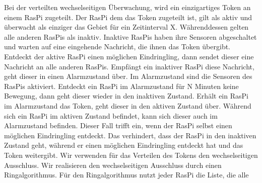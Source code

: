 \documentclass[journal]{IEEEtran}
\begin{document}
Bei der verteilten wechselseitigen Überwachung, wird ein einzigartiges Token an einem RasPi zugeteilt. Der RasPi dem das Token zugeteilt ist, gilt als aktiv und überwacht als einziger das Gebiet für ein Zeitinterval X. Währenddessen gelten alle anderen RasPis als inaktiv. Inaktive RasPis haben ihre Sensoren abgeschaltet und warten auf eine eingehende Nachricht, die ihnen das Token übergibt. Entdeckt der aktive RasPi einen möglichen Eindringling, dann sendet dieser eine Nachricht an alle anderen RasPis. Empfängt ein inaktiver RasPi diese Nachricht, geht dieser in einen Alarmzustand über. Im Alarmzustand sind die Sensoren des RasPis aktiviert. Entdeckt ein RasPi im Alarmzustand für N Minuten keine Bewegung, dann geht dieser wieder in den inaktiven Zustand. Erhält ein RasPi im Alarmzustand das Token, geht dieser in den aktiven Zustand über. Während sich ein RasPi im aktiven Zustand befindet, kann sich dieser auch im Alarmzustand befinden. Dieser Fall trifft ein, wenn der RasPi selbst einen möglichen Eindringling entdeckt. Das verhindert, dass der RasPi in den inaktiven Zustand geht, während er einen möglichen Eindringling entdeckt hat und das Token weitergibt. Wir verwenden für das Verteilen des Tokens den wechselseitigen Ausschluss. Wir realisieren den wechselseitigen Ausschluss durch einen Ringalgorithmus. Für den Ringalgorithmus nutzt jeder RasPi die Liste, die alle 
\end{document}
